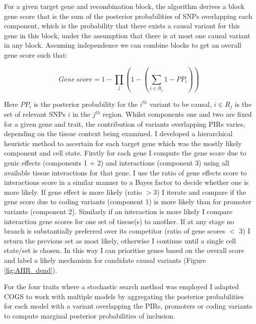 \documentclass[a4paper,11pt]{report}
\begin{document}
For a given target gene and recombination block, the algorithm derives a block gene score that is the sum of the posterior probabilities of SNPs overlapping each component, which is the probability that there exists a causal variant for this gene in this block, under the assumption that there is at most one causal variant in any block. Assuming independence we can combine blocks to get an overall gene score such that:

\begin{equation}
  Gene\ score = 1- \prod_j  \left(1-\left(\sum_{i \in R_j} 1-PP_i \right) \right)
  \label{eqn:cogs_score}
\end{equation}

Here $PP_i$ is the posterior probability for the $i^{th}$ variant to be causal, $i \in R_j$ is the set of relevant SNPs $i$ in the $j^{th}$ region. Whilst components one and two are fixed for a given gene and trait, the contribution of variants overlapping PIRs varies, depending on the tissue context being examined. I developed a hierarchical heuristic method to ascertain for each target gene which was the mostly likely component and cell state. Firstly for each gene I compute the gene score due to genic effects (components 1 $+$ 2) and interactions (component 3) using all available tissue interactions for that gene. I use the ratio of gene effects score to interactions score in a similar manner to a Bayes factor to decide whether one is more likely. If gene effect is more likely (ratio $>$3) I iterate and compare if the gene score due to coding variants (component 1) is more likely than for promoter variants (component 2). Similarly if an interaction is more likely I compare interaction gene scores for one set of tissue(s) to another. If at any stage no branch is substantially preferred over its competitor (ratio of gene scores $<$ 3) I return the previous set as most likely, otherwise I continue until a single cell state/set is chosen. In this way I can prioritise genes based on the overall score and label a likely mechanism for candidate causal variants (Figure \ref{fig:AHR_dend}).

For the four traits where a stochastic search method was employed I adapted COGS to work with multiple models by aggregating the  posterior probabilities for each model with a variant overlapping the PIRs, promoters or coding variants to compute marginal posterior probabilities of inclusion.
\end{document}
